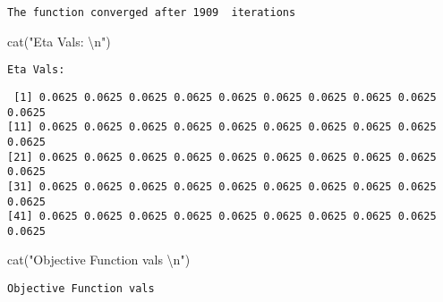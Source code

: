 \documentclass[
  letterpaper,
  DIV=11,
  numbers=noendperiod]{scrartcl}
\newenvironment{Shaded}{\begin{snugshade}}{\end{snugshade}}
\newcommand{\DecValTok}[1]{\textcolor[rgb]{0.68,0.00,0.00}{#1}}
\newcommand{\FunctionTok}[1]{\textcolor[rgb]{0.28,0.35,0.67}{#1}}
\newcommand{\NormalTok}[1]{\textcolor[rgb]{0.00,0.23,0.31}{#1}}
\newcommand{\SpecialCharTok}[1]{\textcolor[rgb]{0.37,0.37,0.37}{#1}}
\newcommand{\StringTok}[1]{\textcolor[rgb]{0.13,0.47,0.30}{#1}}
\begin{document}
\begin{verbatim}
The function converged after 1909  iterations 
\end{verbatim}

\begin{Shaded}
\begin{Highlighting}[]
\FunctionTok{cat}\NormalTok{(}\StringTok{"Eta Vals: }\SpecialCharTok{\textbackslash{}n}\StringTok{"}\NormalTok{)}
\end{Highlighting}
\end{Shaded}

\begin{verbatim}
Eta Vals: 
\end{verbatim}

\begin{Shaded}
\end{Shaded}

\begin{verbatim}
 [1] 0.0625 0.0625 0.0625 0.0625 0.0625 0.0625 0.0625 0.0625 0.0625 0.0625
[11] 0.0625 0.0625 0.0625 0.0625 0.0625 0.0625 0.0625 0.0625 0.0625 0.0625
[21] 0.0625 0.0625 0.0625 0.0625 0.0625 0.0625 0.0625 0.0625 0.0625 0.0625
[31] 0.0625 0.0625 0.0625 0.0625 0.0625 0.0625 0.0625 0.0625 0.0625 0.0625
[41] 0.0625 0.0625 0.0625 0.0625 0.0625 0.0625 0.0625 0.0625 0.0625 0.0625
\end{verbatim}

\begin{Shaded}
\begin{Highlighting}[]
\FunctionTok{cat}\NormalTok{(}\StringTok{"Objective Function vals }\SpecialCharTok{\textbackslash{}n}\StringTok{"}\NormalTok{)}
\end{Highlighting}
\end{Shaded}

\begin{verbatim}
Objective Function vals 
\end{verbatim}

\begin{Shaded}
\end{Shaded}
\end{document}
